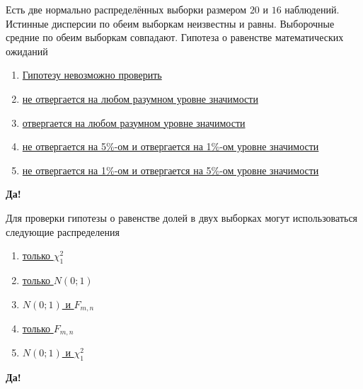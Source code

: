 \documentclass[t]{beamer}
\begin{document}
 \begin{frame} \label{7-Yes} 
\begin{block}{7} 

   Есть две нормально распределённых выборки размером $20$ и $16$ наблюдений. Истинные дисперсии по обеим выборкам неизвестны и равны. Выборочные средние по обеим выборкам совпадают. Гипотеза о равенстве математических ожиданий
  


 \end{block} 
\begin{enumerate} 
\item[] \hyperlink{7-No}{\beamergotobutton{} Гипотезу невозможно проверить}
\item[] \hyperlink{7-Yes}{\beamergotobutton{} не отвергается на любом разумном уровне значимости}
\item[] \hyperlink{7-No}{\beamergotobutton{} отвергается на любом разумном уровне значимости}
\item[] \hyperlink{7-No}{\beamergotobutton{} не отвергается на 5\%-ом и отвергается на 1\%-ом уровне значимости}
\item[] \hyperlink{7-No}{\beamergotobutton{} не отвергается на 1\%-ом и отвергается на 5\%-ом уровне значимости}
\end{enumerate} 

 \textbf{Да!} 
 \hyperlink{8}{}\end{frame} 


 \begin{frame} \label{8-Yes} 
\begin{block}{8} 

  Для проверки гипотезы о равенстве долей в двух выборках  могут использоваться следующие распределения
  


 \end{block} 
\begin{enumerate} 
\item[] \hyperlink{8-No}{\beamergotobutton{} только $\chi^2_1$}
\item[] \hyperlink{8-No}{\beamergotobutton{} только $N(0;1)$}
\item[] \hyperlink{8-No}{\beamergotobutton{} $N(0;1)$ и $F_{m,n}$}
\item[] \hyperlink{8-No}{\beamergotobutton{} только $F_{m,n}$}
\item[] \hyperlink{8-Yes}{\beamergotobutton{} $N(0;1)$ и $\chi^2_1$}
\end{enumerate} 

 \textbf{Да!} 
 \hyperlink{9}{}\end{frame} 
\end{document}
